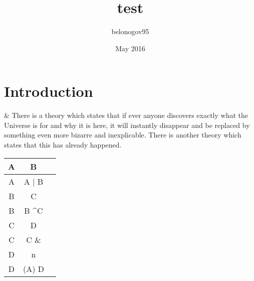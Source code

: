 \documentclass{article}
\title{test}
\author{belonogov95 }
\date{May 2016}
\begin{document}
\maketitle

\section{Introduction}
\&
There is a theory which states that if ever anyone discovers exactly what the Universe is for and why it is here, it will instantly disappear and be replaced by something even more bizarre and inexplicable.
There is another theory which states that this has already happened.

\begin{center}
\begin{tabular}{ | c | c | c| }
    \hline
    A & B \\ \hline
    A & A | B \\ \hline
    B & C \\ \hline
    B & B \textasciicircum C \\ \hline


    C & D \\ \hline
    C & C \& \\ \hline

    D & n  \\ \hline
    D & (A) D \\ \hline

\end{tabular}
\end{center}





\end{document}
